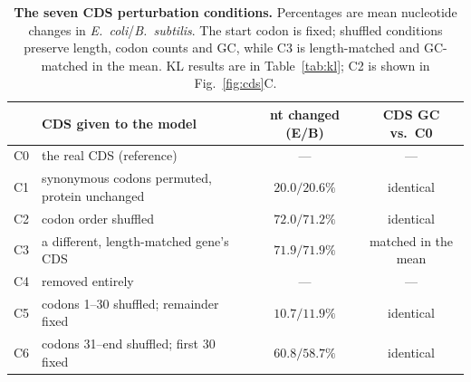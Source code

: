 \documentclass{article}
\numberwithin{figure}{section}
\numberwithin{table}{section}
\numberwithin{equation}{section}
\begin{document}
\begin{table}[htbp]
  \centering
  \footnotesize
  \caption{\textbf{The seven CDS perturbation conditions.} Percentages are mean
  nucleotide changes in \emph{E.~coli}/\emph{B.~subtilis}. The start codon is
  fixed; shuffled conditions preserve length, codon counts and GC, while C3 is
  length-matched and GC-matched in the mean. KL results are in
  Table~\ref{tab:kl}; C2 is shown in Fig.~\ref{fig:cds}C.}
  \label{tab:conditions}
  \begin{tabular}{@{}llcc@{}}
    \toprule
    & CDS given to the model & nt changed (E/B) & CDS GC vs.\ C0 \\
    \midrule
    C0 & the real CDS (reference)                      & ---            & --- \\
    C1 & synonymous codons permuted, protein unchanged & $20.0/20.6\%$  & identical \\
    C2 & codon order shuffled                          & $72.0/71.2\%$  & identical \\
    C3 & a different, length-matched gene's CDS        & $71.9/71.9\%$  & matched in the mean \\
    C4 & removed entirely                              & ---            & --- \\
    C5 & codons 1--30 shuffled; remainder fixed        & $10.7/11.9\%$  & identical \\
    C6 & codons 31--end shuffled; first 30 fixed       & $60.8/58.7\%$  & identical \\
    \bottomrule
  \end{tabular}
\end{table}

\ifdefined\ICBINBSupplementInMain
  \FloatBarrier
\else
  
  
  
\end{document}
